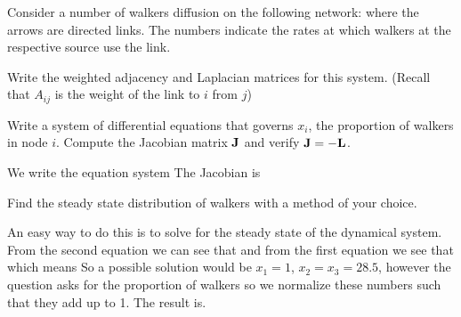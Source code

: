 
Consider a number of walkers diffusion on the following network: 
where the arrows are directed links. The numbers indicate the rates at which walkers at the respective source use the link.

\subquestion
Write the weighted adjacency and Laplacian matrices for this system. (Recall that $A_{ij}$ is the weight of the link to $i$ from $j$)

\solution
{}


\subquestion
Write a system of differential equations that governs $x_i$, the proportion of walkers in node $i$. Compute the Jacobian matrix $\bf J$ and verify ${\bf J} = -{\bf L}$. 

\solution
We write the equation system
The Jacobian is 

\subquestion
Find the steady state distribution of walkers with a method of your choice.

\solution
An easy way to do this is to solve for the steady state of the dynamical system. From the second equation we can see that 
and from the first equation we see that 
which means 
So a possible solution would be $x_1=1$, $x_2=x_3=28.5$, however the question asks for the proportion of walkers so we normalize these numbers such that they add up to 1. The result is. 
